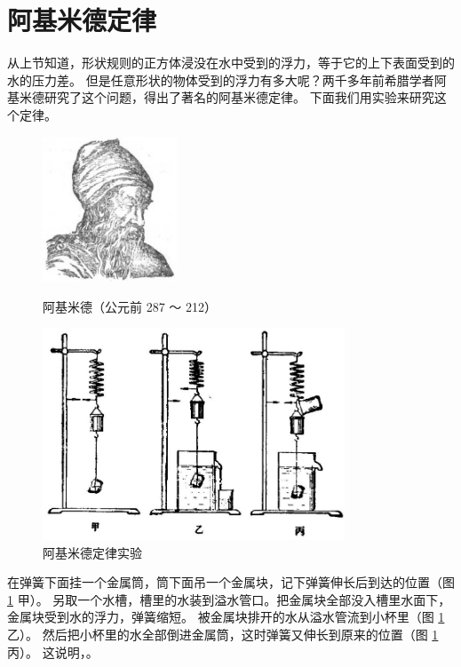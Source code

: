 \section{阿基米德定律}\label{sec:6-2}

从上节知道，形状规则的正方体浸没在水中受到的浮力，等于它的上下表面受到的水的压力差。
但是任意形状的物体受到的浮力有多大呢？两千多年前希腊学者阿基米德研究了这个问题，得出了著名的阿基米德定律。
下面我们用实验来研究这个定律。

\begin{figure}[htbp]
    \centering
    \begin{minipage}{4cm}
    \centering
    \includegraphics[width=4cm]{../pic/czwl1-ch6-archimedes}
    \caption*{阿基米德（公元前 287 ～ 212）}\label{fig:6-archimedes}
    \end{minipage}
    \qquad
    \begin{minipage}{10cm}
    \centering
    \includegraphics[width=9cm]{../pic/czwl1-ch6-3}
    \caption{阿基米德定律实验}\label{fig:6-3}
    \end{minipage}
\end{figure}

在弹簧下面挂一个金属筒，筒下面吊一个金属块，记下弹簧伸长后到达的位置（图 \ref{fig:6-3} 甲）。
另取一个水槽，槽里的水装到溢水管口。把金属块全部没入槽里水面下，金属块受到水的浮力，弹簧缩短。
被金属块排开的水从溢水管流到小杯里（图 \ref{fig:6-3} 乙）。
然后把小杯里的水全部倒进金属筒，这时弹簧又伸长到原来的位置（图 \ref{fig:6-3} 丙）。
这说明，。

